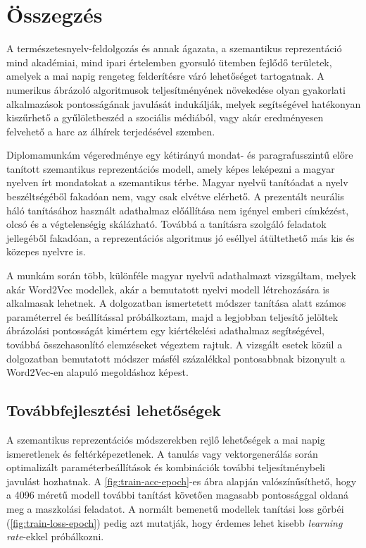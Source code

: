 \chapter{Összegzés} %
\label{ch:sum}

A természetesnyelv-feldolgozás és annak ágazata, a szemantikus reprezentáció mind akadémiai, mind ipari értelemben gyorsuló ütemben fejlődő területek, amelyek a mai napig rengeteg felderítésre váró lehetőséget tartogatnak. A numerikus ábrázoló algoritmusok teljesítményének növekedése olyan gyakorlati alkalmazások pontosságának javulását indukálják, melyek segítségével hatékonyan kiszűrhető a gyűlöletbeszéd a szociális médiából, vagy akár eredményesen felvehető a harc az álhírek terjedésével szemben. 

Diplomamunkám végeredménye egy kétirányú mondat- és paragrafusszintű előre tanított szemantikus reprezentációs modell, amely képes leképezni a magyar nyelven írt mondatokat a szemantikus térbe. Magyar nyelvű tanítóadat a nyelv beszéltségéből fakadóan nem, vagy csak elvétve elérhető. A prezentált neurális háló tanításához használt adathalmaz előállítása nem igényel emberi címkézést, olcsó és a végtelenségig skálázható. Továbbá a tanításra szolgáló feladatok jellegéből fakadóan, a reprezentációs algoritmus jó eséllyel átültethető más kis és közepes nyelvre is.

A munkám során több, különféle magyar nyelvű adathalmazt vizsgáltam, melyek akár Word2Vec modellek, akár a bemutatott nyelvi modell létrehozására is alkalmasak lehetnek. A dolgozatban ismertetett módszer tanítása alatt számos paraméterrel és beállítással próbálkoztam, majd a legjobban teljesítő jelöltek ábrázolási pontosságát kimértem egy kiértékelési adathalmaz segítségével, továbbá összehasonlító elemzéseket végeztem rajtuk. A vizsgált esetek közül a dolgozatban bemutatott módszer másfél százalékkal pontosabbnak bizonyult a Word2Vec-en alapuló megoldáshoz képest.

\section{Továbbfejlesztési lehetőségek}
A szemantikus reprezentációs módszerekben rejlő lehetőségek a mai napig ismeretlenek és feltérképezetlenek. A tanulás vagy vektorgenerálás során optimalizált paraméterbeállítások és kombinációk további teljesítménybeli javulást hozhatnak. A \ref{fig:train-acc-epoch}-es ábra alapján valószínűsíthető, hogy a 4096 méretű modell további tanítást követően magasabb pontossággal oldaná meg a maszkolási feladatot. A normált bemenetű modellek tanítási loss görbéi (\ref{fig:train-loss-epoch}) pedig azt mutatják, hogy érdemes lehet kisebb \textit{learning rate}-ekkel próbálkozni.

